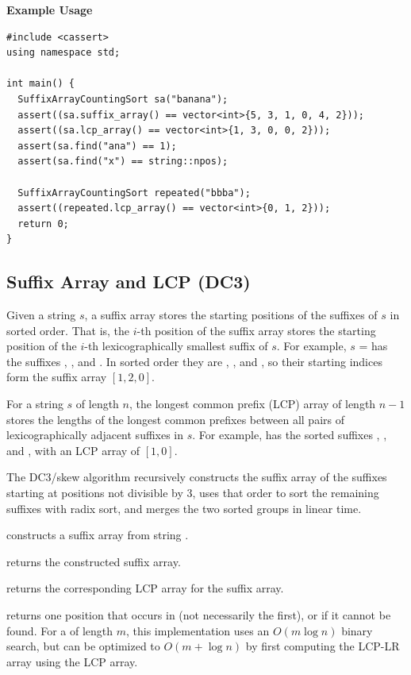 \textbf{Example Usage}\par
\begin{lstlisting}[style=cpp]
#include <cassert>
using namespace std;

int main() {
  SuffixArrayCountingSort sa("banana");
  assert((sa.suffix_array() == vector<int>{5, 3, 1, 0, 4, 2}));
  assert((sa.lcp_array() == vector<int>{1, 3, 0, 0, 2}));
  assert(sa.find("ana") == 1);
  assert(sa.find("x") == string::npos);

  SuffixArrayCountingSort repeated("bbba");
  assert((repeated.lcp_array() == vector<int>{0, 1, 2}));
  return 0;
}
\end{lstlisting}
\subsection{Suffix Array and LCP (DC3)}
\label{sec:3.4.3}
Given a string $s$, a suffix array stores the starting positions of the suffixes of $s$ in sorted order. That is, the $i$-th position of the suffix array stores the starting position of the $i$-th lexicographically smallest suffix of $s$. For example, $s$ =  has the suffixes , , and . In sorted order they are , , and , so their starting indices form the suffix array $[1, 2, 0]$.

For a string $s$ of length $n$, the longest common prefix (LCP) array of length $n - 1$ stores the lengths of the longest common prefixes between all pairs of lexicographically adjacent suffixes in $s$. For example,  has the sorted suffixes , , and , with an LCP array of $[1, 0]$.

The DC3/skew algorithm recursively constructs the suffix array of the suffixes starting at positions not divisible by 3, uses that order to sort the remaining suffixes with radix sort, and merges the two sorted groups in linear time.

\begin{compactitem}
  \item {} constructs a suffix array from string .
  \item {} returns the constructed suffix array.
  \item {} returns the corresponding LCP array for the suffix array.
  \item {} returns one position that  occurs in  (not necessarily the first), or  if it cannot be found. For a  of length $m$, this implementation uses an $O(m \log n)$ binary search, but can be optimized to $O(m + \log n)$ by first computing the LCP-LR array using the LCP array.
\end{compactitem}

